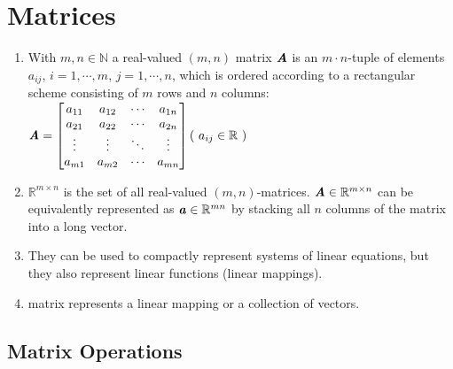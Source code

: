 \chapter{Matrices}

\begin{enumerate}
    \item With $m, n \in \mathbb{N}$ a real-valued $(m, n)$ matrix $\text{\textbf{\textit{A}}}$ is an $m\cdot n$-tuple of elements $a_{ij}$, $i = 1, \cdots , m$, $j = 1, \cdots , n$, which is ordered according to a rectangular scheme consisting of $m$ rows and $n$ columns:
    \\[0.2cm]
    $
        \matname{A}
        = 
        \begin{bmatrix}
            a_{11} & a_{12} & \cdots & a_{1n} \\
            a_{21} & a_{22} & \cdots & a_{2n} \\
            \vdots & \vdots & \ddots & \vdots \\
            a_{m1} & a_{m2} & \cdots & a_{mn} \\
        \end{bmatrix}
        \hfill
        (\ a_{ij} \in \mathbb{R} \ )
    $
    \hfill \cite{mfml/book/mml/Deisenroth-Faisal-Ong}

    \item $\mathbb{R}^{m\times n}$ is the set of all real-valued $(m, n)$-matrices. $\text{\textbf{\textit{A}}} \in \mathbb{R}^{m\times n}$ can be equivalently represented as $\text{\textbf{\textit{a}}} \in \mathbb{R}^{mn}$ by stacking all $n$ columns of the matrix into a long vector.
    \hfill \cite{mfml/book/mml/Deisenroth-Faisal-Ong}

    \vspace{0.5cm}

    \item They can be used to compactly represent systems of linear equations, but they also represent linear functions (linear mappings).
    \hfill \cite{mfml/book/mml/Deisenroth-Faisal-Ong}

    \item matrix represents a linear mapping or a collection of vectors.
    \hfill \cite{mfml/book/mml/Deisenroth-Faisal-Ong}
\end{enumerate}


\section{Matrix Operations}











